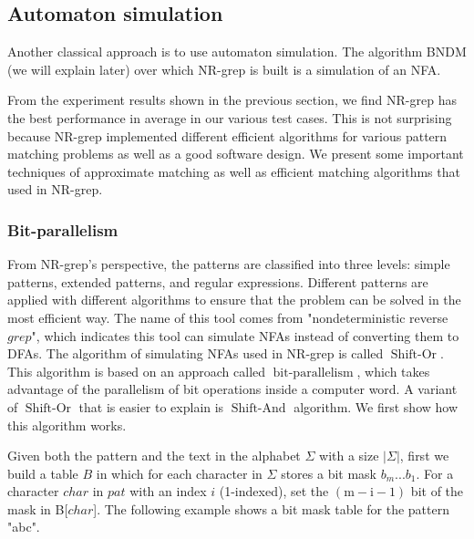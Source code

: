 \subsection{Automaton simulation}
Another classical approach is to use automaton simulation. The algorithm BNDM  (we will explain later) over which NR-grep is built is a simulation of an NFA. 

From the experiment results shown in the previous section, we find NR-grep has the best performance in average in our various test cases. This is not surprising because NR-grep implemented different efficient algorithms for various pattern matching problems as well as a good software design. We present some important techniques of approximate matching as well as efficient matching algorithms that used in NR-grep.

\subsubsection{Bit-parallelism}

From NR-grep's perspective, the patterns are classified into three levels: simple patterns, extended patterns, and regular expressions. Different patterns are applied with different algorithms to ensure that the problem can be solved in the most efficient way. The name of this tool comes from "nondeterministic reverse $grep$", which indicates this tool can simulate NFAs instead of converting them to DFAs. The algorithm of simulating NFAs used in NR-grep is called $\operatorname{Shift-Or}$. This algorithm is based on an approach called $\operatorname{bit-parallelism}$, which takes advantage of the parallelism of bit operations inside a computer word. A variant of $\operatorname{Shift-Or}$ that is easier to explain is $\operatorname{Shift-And}$ algorithm. We first show how this algorithm works. 

Given both the pattern and the text in the alphabet $\Sigma$ with a size $|\Sigma|$, first we build a table $B$ in which for each character in $\Sigma$ stores a bit mask $b_m...b_1$. For a character $char$ in $pat$ with an index $i$ (1-indexed), set the $\operatorname{(m-i-1)}$ bit of the mask in B[$char$]. The following example shows a bit mask table for the pattern "abc".


